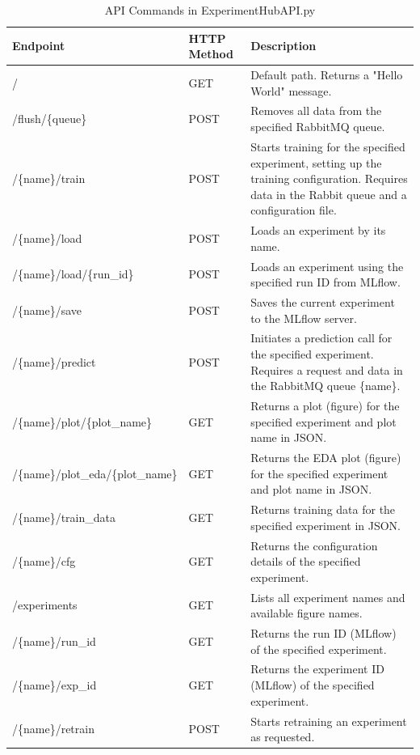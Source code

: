 \documentclass[preprint,12pt, a4paper]{elsarticle}
\begin{document}
\begin{table}[h!]
\caption{API Commands in ExperimentHubAPI.py}
\label{restapi_commands}
\centering
\small %
\begin{tabular}{|p{}|p{}|p{}|}
\hline
\textbf{Endpoint} & \textbf{HTTP Method} & \textbf{Description} \\
\hline
/ & GET & Default path. Returns a "Hello World" message. \\
\hline
/flush/\{queue\} & POST & Removes all data from the specified RabbitMQ queue. \\
\hline
/\{name\}/train & POST & Starts training for the specified experiment, setting up the training configuration. Requires data in the Rabbit queue and a configuration file.\\
\hline
/\{name\}/load & POST & Loads an experiment by its name. \\
\hline
/\{name\}/load/\{run\_id\} & POST & Loads an experiment using the specified run ID from MLflow. \\
\hline
/\{name\}/save & POST & Saves the current experiment to the MLflow server. \\
\hline
/\{name\}/predict & POST & Initiates a prediction call for the specified experiment. Requires a request and data in the RabbitMQ queue \{name\}. \\
\hline
/\{name\}/plot/\{plot\_name\} & GET & Returns a plot (figure) for the specified experiment and plot name in JSON. \\
\hline
/\{name\}/plot\_eda/\{plot\_name\} & GET & Returns the EDA plot (figure) for the specified experiment and plot name in JSON. \\
\hline
/\{name\}/train\_data & GET & Returns training data for the specified experiment in JSON. \\
\hline
/\{name\}/cfg & GET & Returns the configuration details of the specified experiment. \\
\hline
/experiments & GET & Lists all experiment names and available figure names. \\
\hline
/\{name\}/run\_id & GET & Returns the run ID (MLflow) of the specified experiment. \\
\hline
/\{name\}/exp\_id & GET & Returns the experiment ID (MLflow) of the specified experiment. \\
\hline
/\{name\}/retrain & POST & Starts retraining an experiment as requested. \\
\hline
\end{tabular}
\end{table}
\end{document}
